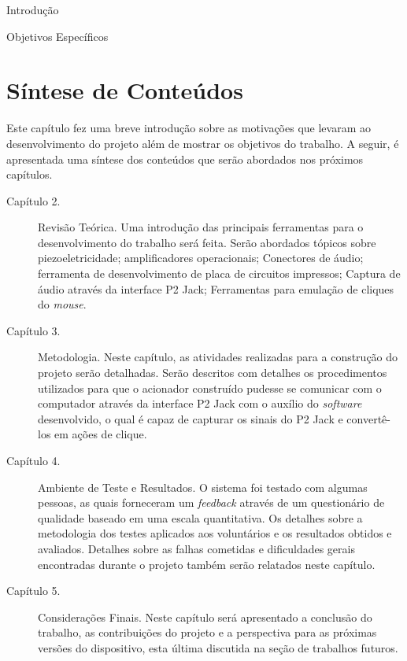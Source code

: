 \begin{chapter}{Introdução}
\begin{subsection}{Objetivos Específicos}
\end{subsection}

\section{Síntese de Conteúdos}

Este capítulo fez uma breve introdução sobre as motivações que levaram ao
desenvolvimento do projeto além de mostrar os objetivos do trabalho.
A seguir, é apresentada uma síntese dos conteúdos que serão abordados nos
próximos capítulos.

\begin{description}
	\item[Capítulo 2.] Revisão Teórica.
	Uma introdução das principais ferramentas para o desenvolvimento do trabalho
será feita. Serão abordados tópicos sobre piezoeletricidade; amplificadores
operacionais; Conectores de áudio; ferramenta de desenvolvimento de placa de
circuitos impressos; Captura de áudio através da interface P2 Jack; Ferramentas
para emulação de cliques do \textit{mouse}. 

	\item[Capítulo 3.] Metodologia. 
	Neste capítulo, as atividades realizadas para a construção do projeto serão
	detalhadas. Serão descritos com detalhes os procedimentos utilizados
	para que o acionador construído pudesse se comunicar com o computador
	através da interface P2 Jack com o auxílio do \textit{software} desenvolvido,
	o qual é capaz de capturar os sinais do P2 Jack e convertê-los em ações de
	clique.
	
	\item[Capítulo 4.] Ambiente de Teste e Resultados. 
	O sistema foi testado com algumas pessoas, as quais forneceram um
	\textit{feedback} através de um questionário de qualidade baseado em uma escala
	quantitativa.  Os detalhes sobre a metodologia dos testes aplicados aos voluntários e
	os resultados obtidos e avaliados. Detalhes sobre as falhas cometidas e
	dificuldades gerais encontradas durante o projeto também serão relatados neste
	capítulo.

	\item[Capítulo 5.] Considerações Finais. 
    Neste capítulo será apresentado a conclusão do trabalho, as contribuições do
	projeto e a perspectiva para as próximas versões do dispositivo, esta última 
	discutida na seção de trabalhos futuros. 

\end{description}

\end{chapter}
